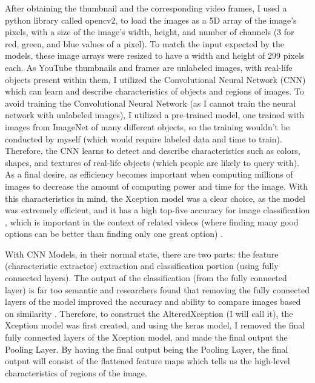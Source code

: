 \documentclass[10pt,twocolumn]{article}
\begin{document}
After obtaining the thumbnail and the corresponding video frames, I used a python library called opencv2, to load the images as a 5D array of the image's pixels, with a size of the image's width, height, and number of channels (3 for red, green, and blue values of a pixel). To match the input expected by the models, these image arrays were resized to have a width and height of 299 pixels each. As YouTube thumbnails and frames are unlabeled images, with real-life objects present within them, I utilized the Convolutional Neural Network (CNN) which can learn and describe characteristics of objects and regions of images. To avoid training the Convolutional Neural Network (as I cannot train the neural network with unlabeled images), I utilized a pre-trained model, one trained with images from ImageNet of many different objects, so the training wouldn't be conducted by myself (which would require labeled data and time to train). Therefore, the CNN learns to detect and describe characteristics such as colors, shapes, and textures of real-life objects (which people are likely to query with). As a final desire, as efficiency becomes important when computing millions of images to decrease the amount of computing power and time for the image. With this characteristics in mind, the Xception model was a clear choice, as the model was extremely efficient, and it has a high top-five accuracy for image classification \cite{Chollet2017}, which is important in the context of related videos (where finding many good options can be better than finding only one great option) \cite{Stancic2022}. 

With CNN Models, in their normal state, there are two parts: the feature (characteristic extractor) extraction and classification portion (using fully connected layers). The output of the classification (from the fully connected layer) is far too semantic and researchers found that removing the fully connected layers of the model improved the accuracy and ability to compare images based on similarity \cite{Qian2020}. Therefore, to construct the AlteredXception (I will call it), the Xception model was first created, and using the keras model, I removed the final fully connected layers of the Xception model, and made the final output the Pooling Layer. By having the final output being the Pooling Layer, the final output will consist of the flattened feature maps which tells us the high-level characteristics of regions of the image.
\end{document}
